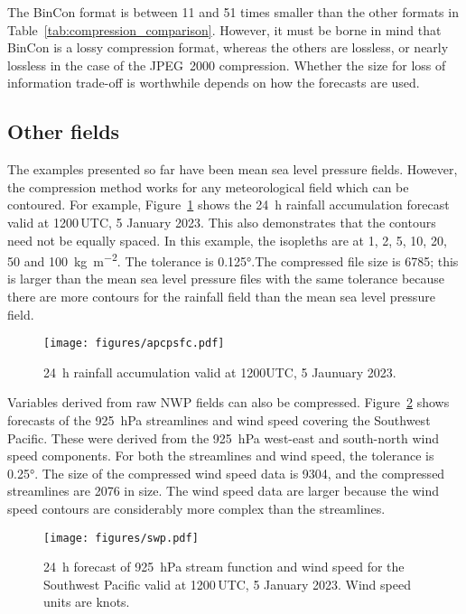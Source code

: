\documentclass[12pt,a4paper]{article}
\begin{document}
The BinCon format is between 11 and 51 times smaller than the other formats in
Table~\ref{tab:compression_comparison}. However, it must be borne in mind that
BinCon is a lossy compression format, whereas the others are lossless, or
nearly lossless in the case of the JPEG~2000 compression. Whether the size for
loss of information trade-off is worthwhile depends on how the forecasts are
used.

\subsection*{Other fields}
\label{sec:other_fields}

The examples presented so far have been mean sea level pressure fields.
However, the compression method works for any meteorological field which can be
contoured. For example, Figure~\ref{fig:rain} shows the \SI{24}{\hour} rainfall
accumulation forecast valid at 1200\,UTC, 5 January 2023. This also demonstrates
that the contours need not be equally spaced. In this example, the isopleths are
at 1, 2, 5, 10, 20, 50 and \SI{100}{\kg\per\m\squared}. The tolerance is
\ang{0.125}.The compressed file size is \SI{6785}{\byte}; this is larger than
the mean sea level pressure files with the same tolerance because there are
more contours for the rainfall field than the mean sea level pressure field.

\begin{figure}
\centering
\texttt{[image: figures/apcpsfc.pdf]}
\caption{\label{fig:rain}\SI{24}{\hour} rainfall accumulation valid
at 1200UTC, 5 Jaunuary 2023.}
\end{figure}

Variables derived from raw NWP fields can also be compressed.
Figure~\ref{fig:swp} shows forecasts of the \SI{925}{\hecto\Pa} streamlines and
wind speed covering the Southwest Pacific. These were derived from the
\SI{925}{\hecto\Pa} west-east and south-north wind speed components. For both
the streamlines and wind speed, the tolerance is \ang{0.25}. The size of the
compressed wind speed data is \SI{9304}{\byte}, and the compressed streamlines
are \SI{2076}{\byte} in size. The wind speed data are larger because the wind
speed contours are considerably more complex than the streamlines.

\begin{figure}
\centering
\texttt{[image: figures/swp.pdf]}
\caption{\label{fig:swp}\SI{24}{\hour} forecast of \SI{925}{\hecto\Pa}
stream function and wind speed for the Southwest Pacific valid
at 1200\,UTC, 5 January 2023. Wind speed units are knots.}
\end{figure}
\end{document}
